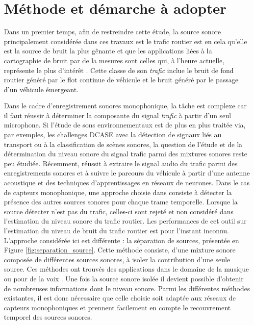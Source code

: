 \section{Méthode et démarche à adopter}

Dans un premier temps, afin de restreindre cette étude, la source sonore principalement considérée dans ces travaux est le trafic routier est en cela qu'elle est la source de bruit la plus gênante et que les applications liées à la cartographie de bruit par de la mesures sont celles qui, à l'heure actuelle, représente le plus d'intérêt \cite{jagniatinskis2014assessment}.
Cette classe de son \textit{trafic} inclue le bruit de fond routier généré par le flot continue de véhicule et le bruit généré par le passage d'un véhicule émergeant.


Dans le cadre d'enregistrement sonores monophonique, la tâche est complexe car il faut réussir à déterminer la composante du signal \textit{trafic} à partir d'un seul microphone. Si l'étude de sons environnementaux est de plus en plus traitée via, par exemples, les challenges DCASE \cite{stowell2015detection,mesaros2017dcase} avec la détection de signaux liés au transport ou à la classification de scènes sonores, la question de l'étude et de la détermination du niveau sonore du signal trafic parmi des mixtures sonores reste peu étudiée. Récemment, \cite{leiba} réussit à extraire le signal audio du trafic parmi des enregistrements sonores et à suivre le parcours du véhicule à partir d'une antenne acoustique et des techniques d'apprentissages en réseaux de neurones. 
Dans le cas de capteurs monophonique, une approche choisie dans \cite{socoro2017anomalous} consiste à détecter la présence des autres sources sonores pour chaque trame temporelle. Lorsque la source détecter n'est pas du trafic, celles-ci sont rejeté et non considéré dans l'estimation du niveau sonore du trafic routier. Les performances de cet outil sur l'estimation du niveau de bruit du trafic routier est pour l'instant inconnu.
L'approche considérée ici est différente : la séparation de sources, présentée en Figure \ref{fig:separation_source}. Cette méthode consiste, d'une mixture sonore composée de différentes sources sonores, à isoler la contribution d'une seule source. Ces méthodes ont trouvés des applications dans le domaine de la musique \cite{smaragdis_non-negative_2003,virtanen2007monaural} ou pour de la voix \cite{weninger2012supervised,yilmaz2004blind}. Une fois la source sonore isolée il devient possible d'obtenir de nombreuses informations dont le niveau sonore. Parmi les différentes méthodes existantes, il est donc nécessaire que celle choisie soit adaptée aux réseaux de capteurs monophoniques et prennent facilement en compte le recouvrement temporel des sources sonores. 

